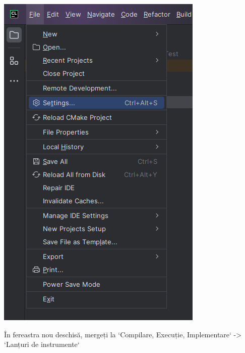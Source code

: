 \documentclass[../ro-fa-lab.tex]{subfiles}
\begin{document}
\includegraphics[width=\textwidth,alt={A screenshot of a computer program Description automatically generated}]{./Resources/tutorial_lab9/image19.png}

În fereastra nou deschisă, mergeți la `Compilare, Execuție, Implementare` -> `Lanțuri de instrumente`
\end{document}
